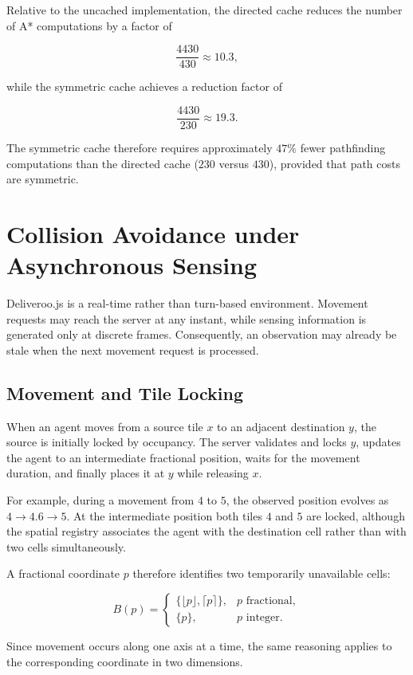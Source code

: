 \documentclass[a4paper]{article}
\begin{document}
Relative to the uncached implementation, the directed cache reduces the
number of A* computations by a factor of

\[
\frac{4430}{430} \approx 10.3,
\]

while the symmetric cache achieves a reduction factor of

\[
\frac{4430}{230} \approx 19.3.
\]

The symmetric cache therefore requires approximately $47\%$ fewer
pathfinding computations than the directed cache ($230$ versus $430$),
provided that path costs are symmetric.

\section{Collision Avoidance under Asynchronous Sensing}
\label{sec:collision-avoidance}

Deliveroo.js is a real-time rather than turn-based environment. Movement
requests may reach the server at any instant, while sensing information is
generated only at discrete frames. Consequently, an observation may already
be stale when the next movement request is processed.

\subsection{Movement and Tile Locking}

When an agent moves from a source tile $x$ to an adjacent destination $y$, the
source is initially locked by occupancy. The server validates and locks $y$,
updates the agent to an intermediate fractional position, waits for the
movement duration, and finally places it at $y$ while releasing $x$.

For example, during a movement from $4$ to $5$, the observed position evolves
as $4 \rightarrow 4.6 \rightarrow 5$. At the intermediate position both tiles
$4$ and $5$ are locked, although the spatial registry associates the agent
with the destination cell rather than with two cells simultaneously.

A fractional coordinate $p$ therefore identifies two temporarily unavailable
cells:

\[
B(p)=
\begin{cases}
\{\lfloor p\rfloor,\lceil p\rceil\}, & p \text{ fractional},\\
\{p\}, & p \text{ integer}.
\end{cases}
\]

Since movement occurs along one axis at a time, the same reasoning applies to
the corresponding coordinate in two dimensions.
\end{document}
